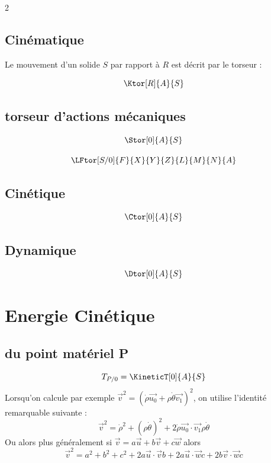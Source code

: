 \documentclass[10pt,a4paper]{article}
\renewcommand{\vec}{\overrightarrow}
\begin{document}
\begin{multicols}{2}
        \subsection*{Cinématique}

        Le mouvement d'un solide $S$ par rapport à $R$ est décrit par le torseur :

        \[ \Ktor[R]{A}{S} \]

        \subsection*{torseur d'actions mécaniques}

        $$ \Stor[0]{A}{S} $$

        $$ \LFtor[S/0]{F}{X}{Y}{Z}{L}{M}{N}{A} $$

        \subsection*{Cinétique}

        \[
        \Ctor[0]{A}{S}
        \]

        \subsection*{Dynamique}

        \[
        \Dtor[0]{A}{S}
        \]

    \end{multicols}

    \clearpage

    \section{Energie Cinétique}

        \subsection*{du point matériel P}
            $$ T_{P/0}  = \KineticT[0]{A}{S} $$
            Lorsqu'on calcule par exemple $\vec v^2 = (\dot{\rho} \vec{u_0} + \rho \dot{\theta} \vec{v_1})^2$, on utilise l'identité remarquable suivante :
            $$ \vec v^2 = \dot{\rho}^2 + (\rho \dot{\theta})^2 + 2\dot{\rho} \vec{u_0} \cdot \vec{v_1} \rho \dot{\theta} $$
            Ou alors plus généralement si $\vec v = a \vec u + b \vec v + c \vec w$ alors
            $$ \vec v^2 = a^2 + b^2 + c^2 + 2a \vec u \cdot \vec v b + 2a \vec u \cdot \vec w c + 2b \vec v \cdot \vec w c $$
\end{document}
